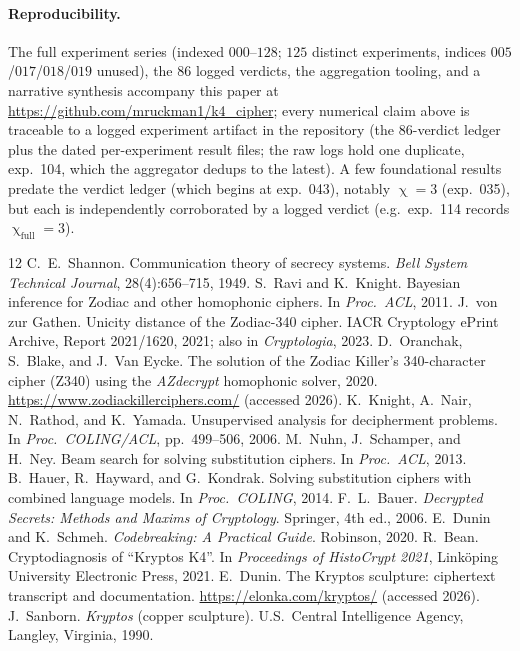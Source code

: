 \documentclass[11pt]{article}
\theoremstyle{plain}
\theoremstyle{definition}
\DeclareMathOperator{\chrom}{\chi}
\begin{document}
\paragraph{Reproducibility.} The full experiment series (indexed $000$--$128$; $125$
distinct experiments, indices $005$/$017$/$018$/$019$ unused), the $86$ logged
verdicts, the aggregation tooling, and a narrative synthesis accompany this paper at
\url{https://github.com/mruckman1/k4_cipher};
every numerical claim above is traceable to a logged experiment artifact in the
repository (the $86$-verdict ledger plus the dated per-experiment result files; the
raw logs hold one duplicate, exp.~104, which the aggregator dedups to the latest). A
few foundational results predate the verdict ledger (which begins at exp.~043),
notably $\chrom=3$ (exp.~035), but each is independently corroborated by a logged
verdict (e.g.\ exp.~114 records $\chrom_{\text{full}}=3$).

\begin{thebibliography}{12}
 C.~E.~Shannon. Communication theory of secrecy systems.
\emph{Bell System Technical Journal}, 28(4):656--715, 1949.
 S.~Ravi and K.~Knight. Bayesian inference for Zodiac and other
homophonic ciphers. In \emph{Proc.\ ACL}, 2011.
 J.~von zur Gathen. Unicity distance of the Zodiac-340
cipher. IACR Cryptology ePrint Archive, Report 2021/1620, 2021; also in
\emph{Cryptologia}, 2023.
 D.~Oranchak, S.~Blake, and J.~Van Eycke. The solution of the
Zodiac Killer's 340-character cipher (Z340) using the \emph{AZdecrypt} homophonic
solver, 2020. \url{https://www.zodiackillerciphers.com/} (accessed 2026).
 K.~Knight, A.~Nair, N.~Rathod, and K.~Yamada. Unsupervised
analysis for decipherment problems. In \emph{Proc.\ COLING/ACL}, pp.~499--506,
2006.
 M.~Nuhn, J.~Schamper, and H.~Ney. Beam search for solving
substitution ciphers. In \emph{Proc.\ ACL}, 2013.
 B.~Hauer, R.~Hayward, and G.~Kondrak. Solving substitution
ciphers with combined language models. In \emph{Proc.\ COLING}, 2014.
 F.~L.~Bauer. \emph{Decrypted Secrets: Methods and Maxims of
Cryptology}. Springer, 4th ed., 2006.
 E.~Dunin and K.~Schmeh. \emph{Codebreaking: A Practical Guide}.
Robinson, 2020.
 R.~Bean. Cryptodiagnosis of ``Kryptos K4''. In \emph{Proceedings
of HistoCrypt 2021}, Link\"oping University Electronic Press, 2021.
 E.~Dunin. The Kryptos sculpture: ciphertext transcript and
documentation. \url{https://elonka.com/kryptos/} (accessed 2026).
 J.~Sanborn. \emph{Kryptos} (copper sculpture). U.S.\ Central
Intelligence Agency, Langley, Virginia, 1990.
\end{thebibliography}
\end{document}
